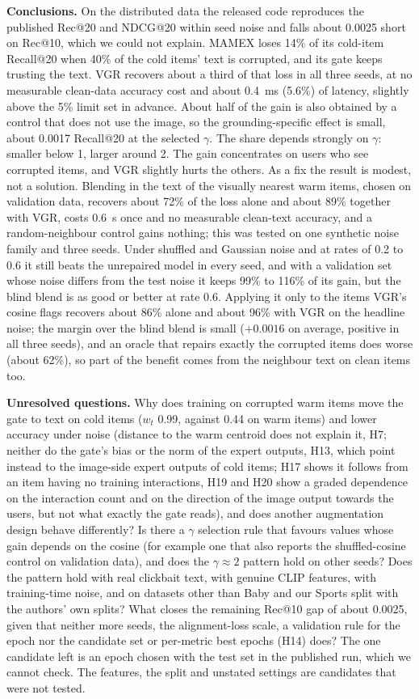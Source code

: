 \documentclass[conference]{IEEEtran}
\begin{document}
\textbf{Conclusions.} On the distributed data the released code reproduces the published Rec@20 and NDCG@20 within seed noise and falls about 0.0025 short on Rec@10, which we could not explain. MAMEX loses 14\% of its cold-item Recall@20 when 40\% of the cold items' text is corrupted, and its gate keeps trusting the text. VGR recovers about a third of that loss in all three seeds, at no measurable clean-data accuracy cost and about 0.4~ms (5.6\%) of latency, slightly above the 5\% limit set in advance. About half of the gain is also obtained by a control that does not use the image, so the grounding-specific effect is small, about 0.0017 Recall@20 at the selected $\gamma$. The share depends strongly on $\gamma$: smaller below 1, larger around 2. The gain concentrates on users who see corrupted items, and VGR slightly hurts the others. As a fix the result is modest, not a solution. Blending in the text of the visually nearest warm items, chosen on validation data, recovers about 72\% of the loss alone and about 89\% together with VGR, costs 0.6~s once and no measurable clean-text accuracy, and a random-neighbour control gains nothing; this was tested on one synthetic noise family and three seeds. Under shuffled and Gaussian noise and at rates of 0.2 to 0.6 it still beats the unrepaired model in every seed, and with a validation set whose noise differs from the test noise it keeps 99\% to 116\% of its gain, but the blind blend is as good or better at rate 0.6. Applying it only to the items VGR's cosine flags recovers about 86\% alone and about 96\% with VGR on the headline noise; the margin over the blind blend is small ($+0.0016$ on average, positive in all three seeds), and an oracle that repairs exactly the corrupted items does worse (about 62\%), so part of the benefit comes from the neighbour text on clean items too.

\textbf{Unresolved questions.} Why does training on corrupted warm items move the gate to text on cold items ($w_t$ 0.99, against 0.44 on warm items) and lower accuracy under noise (distance to the warm centroid does not explain it, H7; neither do the gate's bias or the norm of the expert outputs, H13, which point instead to the image-side expert outputs of cold items; H17 shows it follows from an item having no training interactions, H19 and H20 show a graded dependence on the interaction count and on the direction of the image output towards the users, but not what exactly the gate reads), and does another augmentation design behave differently? Is there a $\gamma$ selection rule that favours values whose gain depends on the cosine (for example one that also reports the shuffled-cosine control on validation data), and does the $\gamma\approx2$ pattern hold on other seeds? Does the pattern hold with real clickbait text, with genuine CLIP features, with training-time noise, and on datasets other than Baby and our Sports split with the authors' own splits? What closes the remaining Rec@10 gap of about 0.0025, given that neither more seeds, the alignment-loss scale, a validation rule for the epoch nor the candidate set or per-metric best epochs (H14) does? The one candidate left is an epoch chosen with the test set in the published run, which we cannot check. The features, the split and unstated settings are candidates that were not tested.
\end{document}
